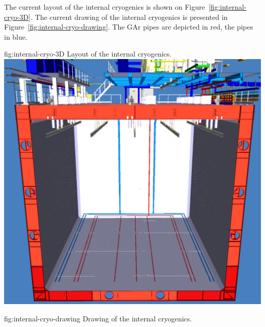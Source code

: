 The current layout of the internal cryogenics is shown on Figure~\ref{fig:internal-cryo-3D}. The current drawing of the internal cryogenics is presented in Figure~\ref{fig:internal-cryo-drawing}. The GAr pipes are depicted in red, the  pipes in blue.

\begin{dunefigure}{fig:internal-cryo-3D}
  {Layout of the internal cryogenics.}
\includegraphics[width=.98\textwidth]{graphics/Internal-Piping-3D.pdf}
\end{dunefigure}

\begin{dunefigure}{fig:internal-cryo-drawing}
  {Drawing of the internal cryogenics.}
\end{dunefigure}

